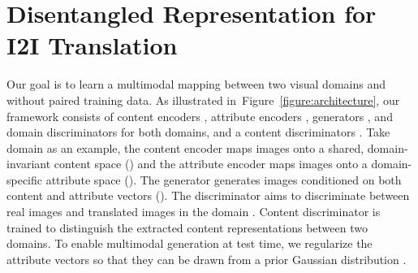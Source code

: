 \documentclass[runningheads]{llncs}
\newlength\figmargin
\newlength\secmargin
\newcommand{\figref}[1]{Figure~\ref{figure:#1}}
\begin{document}
\begin{figure*}[t]
	\centering
    
    \begin{minipage}[b]{0.491\textwidth}
    \end{minipage}
    \hspace{4mm}
    \begin{minipage}[b]{0.409\textwidth}
    \end{minipage}
    \caption{\textbf{Method overview.} (a) With the proposed content adversarial loss  (Section~\ref{subsec:conadv}) and the cross-cycle consistency loss  (Section~\ref{subsec:crosscycle}), we are able to learn the multimodal mapping between the domain  and  with unpaired data. 
Thanks to the proposed disentangled representation, we can generate output images conditioned on either (b) random attributes or (c) a given attribute at test time.}
    \label{figure:architecture}
    \vspace{\figmargin}
\end{figure*}




\section{Disentangled Representation for I2I Translation}
\label{sec:framework}
\vspace{\secmargin}
Our goal is to learn a multimodal mapping between two visual domains  and  without paired training data.
As illustrated in~\figref{architecture}, our framework consists of content encoders , attribute encoders , generators , and domain discriminators  for both domains, and a content discriminators .
Take domain  as an example, the content encoder  maps images onto a shared, domain-invariant content space () and the attribute encoder  maps images onto a domain-specific attribute space ().
The generator  generates images conditioned on both content and attribute vectors ().
The discriminator  aims to discriminate between real images and translated images in the domain .
Content discriminator  is trained to distinguish the extracted content representations between two domains.
To enable multimodal generation at test time, we regularize the attribute vectors so that they can be drawn from a prior Gaussian distribution . 
\end{document}

